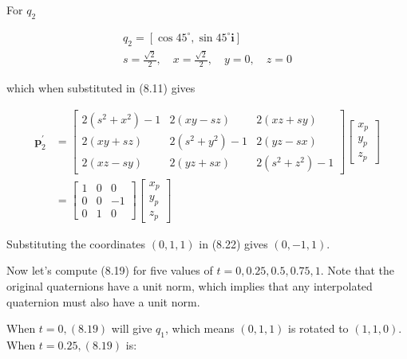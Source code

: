 \documentclass[10pt]{article}
\begin{document}
For $q_{2}$

$$
\begin{gathered}
q_{2}=\left[\cos 45^{\circ}, \sin 45^{\circ} \mathbf{i}\right] \\
s=\frac{\sqrt{2}}{2}, \quad x=\frac{\sqrt{2}}{2}, \quad y=0, \quad z=0
\end{gathered}
$$

which when substituted in (8.11) gives

$$
\begin{aligned}
\mathbf{p}_{2}^{\prime} & =\left[\begin{array}{ccc}
2\left(s^{2}+x^{2}\right)-1 & 2(x y-s z) & 2(x z+s y) \\
2(x y+s z) & 2\left(s^{2}+y^{2}\right)-1 & 2(y z-s x) \\
2(x z-s y) & 2(y z+s x) & 2\left(s^{2}+z^{2}\right)-1
\end{array}\right]\left[\begin{array}{l}
x_{p} \\
y_{p} \\
z_{p}
\end{array}\right] \\
& =\left[\begin{array}{ccc}
1 & 0 & 0 \\
0 & 0 & -1 \\
0 & 1 & 0
\end{array}\right]\left[\begin{array}{l}
x_{p} \\
y_{p} \\
z_{p}
\end{array}\right]
\end{aligned}
$$

Substituting the coordinates $(0,1,1)$ in (8.22) gives $(0,-1,1)$.

Now let's compute (8.19) for five values of $t=0,0.25,0.5,0.75,1$. Note that the original quaternions have a unit norm, which implies that any interpolated quaternion must also have a unit norm.

When $t=0,(8.19)$ will give $q_{1}$, which means $(0,1,1)$ is rotated to $(1,1,0)$. When $t=0.25,(8.19)$ is:
\end{document}
